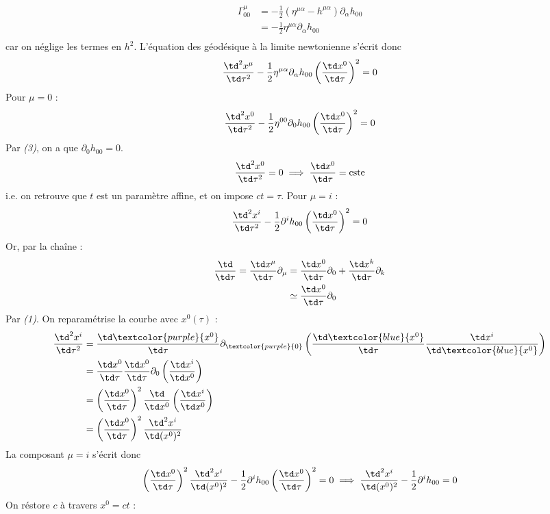 \begin{align}
    \Gamma^{\mu}_{0 0} &=-\frac{1}{2}(\eta^{\mu \alpha} - h^{\mu \alpha })\partial_{\alpha}h_{00}\\
    &= -\frac{1}{2}\eta^{\mu \alpha}\partial_{\alpha}h_{00}\\
\end{align}
car on néglige les termes en $h^2$. L'équation des géodésique à la limite newtonienne s'écrit donc
\begin{equation}
     \frac{\td ^2x^{\mu}}{\td \tau^2} -\frac{1}{2}\eta^{\mu \alpha}\partial_{\alpha}h_{00}\left(\frac{\td x^{0}}{\td \tau}\right)^2 = 0
\end{equation}
Pour $\mu = 0$ :
\begin{align}
     &\frac{\td ^2x^{0}}{\td \tau^2} -\frac{1}{2}\eta^{00}\partial_{0}h_{00}\left(\frac{\td x^{0}}{\td \tau}\right)^2 = 0\\
\end{align}
Par \textit{(3)}, on a que $\partial_{0}h_{00} =0$.
\begin{equation}
    \frac{\td ^2x^{0}}{\td \tau^2} = 0 \implies \frac{\td x^{0}}{\td \tau} = \text{cste}
\end{equation}
i.e. on retrouve que $t$ est un paramètre affine, et on impose $ct = \tau$.
Pour $\mu = i$ :
\begin{align}
     &\frac{\td ^2x^{i}}{\td \tau^2} -\frac{1}{2}\partial^{i}h_{00}\left(\frac{\td x^{0}}{\td \tau}\right)^2 = 0\\
\end{align}
Or, par la chaîne :
\begin{align}
    \frac{\td }{\td \tau} = \frac{\td x^{\mu}}{\td \tau} \partial_{\mu}& = \frac{\td x^{0}}{\td \tau} \partial_{0} + \frac{\td x^{k}}{\td \tau} \partial_{k}\\
    & \simeq \frac{\td x^{0}}{\td \tau} \partial_{0}
\end{align}
Par \textit{(1)}. On reparamétrise la courbe avec $x^0(\tau)$ :
\begin{align}
     \frac{\td^2 x^{i}}{\td \tau^2} &= \frac{\td \textcolor{purple}{x^{0}}}{\td \tau} \partial_{\textcolor{purple}{0}}\left( \frac{\td \textcolor{blue}{x^{0}}}{\td \tau} \frac{\td x^{i}}{\td \textcolor{blue}{x^0}}\right)\\
     &=\frac{\td x^{0}}{\td \tau} \frac{\td x^{0}}{\td \tau}\partial_{0}\left(\frac{\td x^{i}}{\td x^0}\right) \\
     &=\left(\frac{\td x^{0}}{\td \tau}\right)^2 \frac{\td }{\td x^0}\left(\frac{\td x^{i}}{\td x^0}\right)\\
     &=\left(\frac{\td x^{0}}{\td \tau}\right)^2 \frac{\td ^2 x^{i}}{\td (x^0)^2}
\end{align}
La composant $\mu = i$ s'écrit donc
 \begin{align}
     \left(\frac{\td x^{0}}{\td \tau}\right)^2 \frac{\td ^2 x^{i}}{\td (x^0)^2} -\frac{1}{2}\partial^{i}h_{00}\left(\frac{\td x^{0}}{\td \tau}\right)^2 = 0\implies \frac{\td ^2 x^{i}}{\td (x^0)^2} -\frac{1}{2}\partial^{i}h_{00}=0
\end{align}
On réstore $c$ à travers $x^0 = ct$ :

